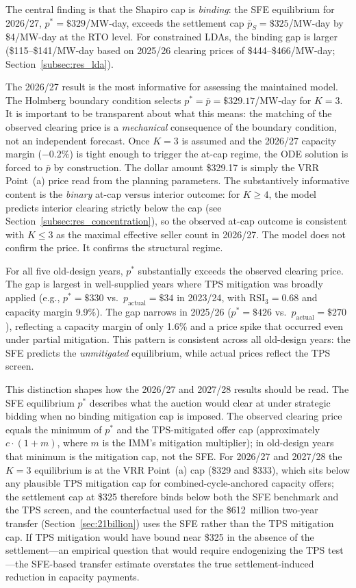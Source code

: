 The central finding is that the Shapiro cap is \emph{binding}: the SFE
equilibrium for 2026/27, $p^* = \$329$/MW-day, exceeds the settlement cap
$\bar{p}_S = \$325$/MW-day by \$4/MW-day at the RTO level. For constrained
LDAs, the binding gap is larger (\$115--\$141/MW-day based on 2025/26
clearing prices of \$444--\$466/MW-day; Section~\ref{subsec:res_lda}).

The 2026/27 result is the most informative for assessing the maintained model. The Holmberg
boundary condition selects $p^* = \bar{p} = \$329.17$/MW-day for $K = 3$.
It is important to be transparent about what this means: the matching of the
observed clearing price is a \emph{mechanical} consequence of the boundary
condition, not an independent forecast. Once $K = 3$ is assumed and the
2026/27 capacity margin ($-0.2\%$) is tight enough to trigger the
at-cap regime, the ODE solution is forced to $\bar{p}$ by construction.
The dollar amount \$329.17 is simply the VRR Point~(a) price read from
the planning parameters. The substantively informative content is the
\emph{binary} at-cap versus interior outcome: for $K \geq 4$, the model
predicts interior clearing strictly below the cap (see
Section~\ref{subsec:res_concentration}), so the observed at-cap outcome
is consistent with $K \leq 3$ as the maximal effective seller count
in 2026/27. The model does not confirm the price. It confirms
the structural regime.

For all five old-design years, $p^*$ substantially exceeds the observed
clearing price. The gap is largest in well-supplied years where TPS
mitigation was broadly applied (e.g., $p^* = \$330$ vs.\ $p_{\text{actual}}
= \$34$ in 2023/24, with RSI$_3 = 0.68$ and capacity margin 9.9\%).
The gap narrows in 2025/26 ($p^* = \$426$ vs.\ $p_{\text{actual}} = \$270$),
reflecting a capacity margin of only 1.6\% and a price spike that occurred
even under partial mitigation. This pattern is consistent across all
old-design years: the SFE predicts the \emph{unmitigated} equilibrium,
while actual prices reflect the TPS screen.

This distinction shapes how the 2026/27 and 2027/28 results should be read.
The SFE equilibrium $p^*$ describes what the auction would clear at under
strategic bidding when no binding mitigation cap is imposed. The observed
clearing price equals the minimum of $p^*$ and the TPS-mitigated offer cap
(approximately $c \cdot (1 + m)$, where $m$ is the IMM's mitigation
multiplier); in old-design years that minimum is the mitigation cap, not
the SFE. For 2026/27 and 2027/28 the $K = 3$ equilibrium is at the VRR
Point~(a) cap (\$329 and \$333), which sits below any plausible TPS
mitigation cap for combined-cycle-anchored capacity offers; the
settlement cap at \$325 therefore binds below both the SFE benchmark and
the TPS screen, and the counterfactual used for the \$612~million two-year
transfer (Section~\ref{sec:21billion}) uses the SFE rather than the TPS
mitigation cap. If TPS mitigation would have bound near \$325 in the
absence of the settlement---an empirical question that would require
endogenizing the TPS test---the SFE-based transfer estimate overstates
the true settlement-induced reduction in capacity payments.

